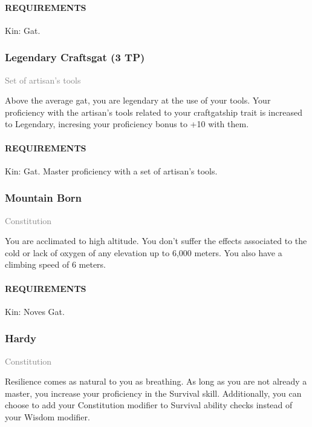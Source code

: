     \paragraph{REQUIREMENTS} Kin: Gat.

    \subsubsection{Legendary Craftsgat (3 TP)} \label{tal::legendarycraftsgat}
    \small{\textcolor{gray}{Set of artisan's tools}}

    \normalsize
    Above the average gat, you are legendary at the use of your tools.
    Your proficiency with the artisan's tools related to your craftgatship trait is increased to Legendary, incresing your proficiency bonus to +10 with them.
    \paragraph{REQUIREMENTS} Kin: Gat. Master proficiency with a set of artisan's tools.

    \subsubsection{Mountain Born} \label{tal::mountainborn}
    \small{\textcolor{gray}{Constitution}}

    \normalsize
    You are acclimated to high altitude.
    You don't suffer the effects associated to the cold or lack of oxygen of any elevation up to 6,000 meters.
    You also have a climbing speed of 6 meters.
    \paragraph{REQUIREMENTS} Kin: Noves Gat.

    \subsubsection{Hardy} \label{tal::hardy}
    \small{\textcolor{gray}{Constitution}}

    \normalsize
    Resilience comes as natural to you as breathing.
    As long as you are not already a master, you increase your proficiency in the Survival skill.
    Additionally, you can choose to add your Constitution modifier to Survival ability checks instead of your Wisdom modifier.
